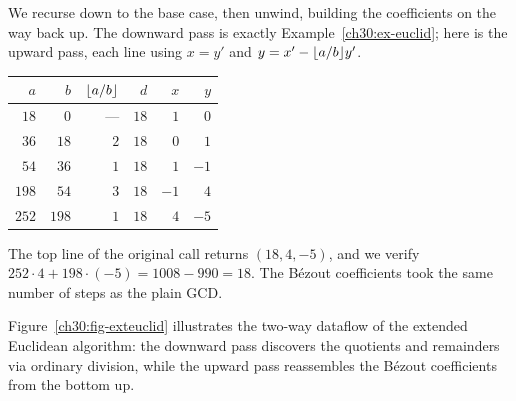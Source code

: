 \begin{example}
\label{ch30:ex-exteuclid}
We recurse down to the base case, then unwind, building the coefficients on the
way back up. The downward pass is exactly Example~\ref{ch30:ex-euclid}; here is
the upward pass, each line using $x = y'$ and $y = x' - \lfloor a/b\rfloor y'$.
\begin{center}
\begin{tabular}{r r r r r r}
\toprule
$a$ & $b$ & $\lfloor a/b\rfloor$ & $d$ & $x$ & $y$ \\
\midrule
$18$  & $0$   & ---  & $18$ & $1$  & $0$  \\
$36$  & $18$  & $2$  & $18$ & $0$  & $1$  \\
$54$  & $36$  & $1$  & $18$ & $1$  & $-1$ \\
$198$ & $54$  & $3$  & $18$ & $-1$ & $4$  \\
$252$ & $198$ & $1$  & $18$ & $4$  & $-5$ \\
\bottomrule
\end{tabular}
\end{center}
The top line of the original call returns $(18, 4, -5)$, and we verify $252\cdot
4 + 198\cdot(-5) = 1008 - 990 = 18$. The B\'ezout coefficients took the
same number of steps as the plain GCD.
\end{example}

Figure~\ref{ch30:fig-exteuclid} illustrates the two-way dataflow of the
extended Euclidean algorithm: the downward pass discovers the quotients and
remainders via ordinary division, while the upward pass reassembles the B\'ezout
coefficients from the bottom up.

